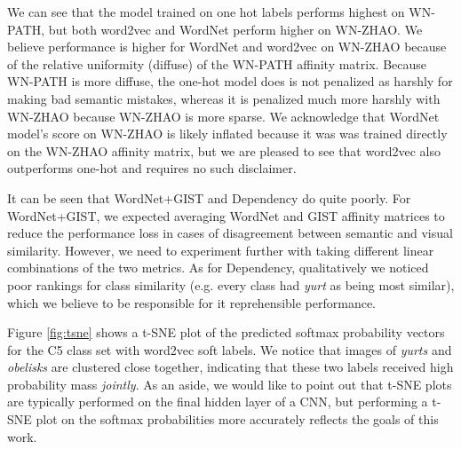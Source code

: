 We can see that the model trained on one hot labels performs highest on WN-PATH,
but both word2vec and WordNet perform higher on WN-ZHAO. We believe performance
is higher for WordNet and word2vec on WN-ZHAO because of the relative uniformity
(diffuse) of the WN-PATH affinity matrix. Because WN-PATH is more diffuse, the
one-hot model does is not penalized as harshly for making bad semantic mistakes,
whereas it is penalized much more harshly with WN-ZHAO because WN-ZHAO is more
sparse. We acknowledge that WordNet model's score on WN-ZHAO is likely inflated
because it was was trained directly on the WN-ZHAO affinity matrix, but we are
pleased to see that word2vec also outperforms one-hot and requires no such
disclaimer.

It can be seen that WordNet+GIST and Dependency do quite poorly. For
WordNet+GIST, we expected averaging WordNet and GIST affinity matrices to reduce
the performance loss in cases of disagreement between semantic and visual
similarity. However, we need to experiment further with taking different linear
combinations of the two metrics. As for Dependency, qualitatively we noticed
poor rankings for class similarity (e.g. every class had \emph{yurt} as being
most similar), which we believe to be responsible for it reprehensible
performance.

Figure \ref{fig:tsne} shows a t-SNE plot of the predicted softmax probability
vectors for the C5 class set with word2vec soft labels. We notice that images of
\emph{yurts} and \emph{obelisks} are clustered close together, indicating that
these two labels received high probability mass \emph{jointly}. As an aside, we
would like to point out that t-SNE plots are typically performed on the final
hidden layer of a CNN, but performing a t-SNE plot on the softmax probabilities
more accurately reflects the goals of this work.



%
